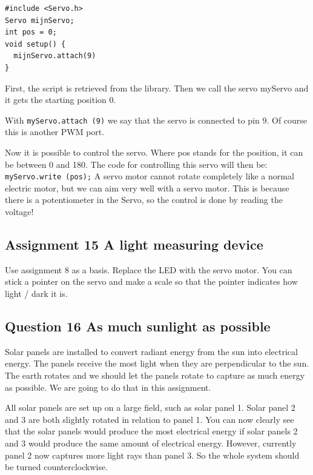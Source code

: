 \documentclass{arduino}
\begin{document}
\begin{lstlisting}
#include <Servo.h>
Servo mijnServo;
int pos = 0;
void setup() {
  mijnServo.attach(9)
}
\end{lstlisting}

First, the script is retrieved from the library. Then we call the servo myServo and it gets the starting position 0.

With \lstinline{myServo.attach (9)} we say that the servo is connected to pin 9. Of course this is another PWM port.

Now it is possible to control the servo. Where pos stands for the position, it can be between 0 and 180. The code for controlling this servo will then be: \lstinline{myServo.write (pos);} A servo motor cannot rotate completely like a normal electric motor, but we can aim very well with a servo motor. This is because there is a potentiometer in the Servo, so the control is done by reading the voltage!

\subsection{Assignment 15 A light measuring device}

Use assignment 8 as a basis. Replace the LED with the servo motor. You can stick a pointer on the servo and make a scale so that the pointer indicates how light / dark it is.

\subsection{Question 16 As much sunlight as possible}


Solar panels are installed to convert radiant energy from the sun into electrical energy. The panels receive the most light when they are perpendicular to the sun. The earth rotates and we should let the panels rotate to capture as much energy as possible. We are going to do that in this assignment.

All solar panels are set up on a large field, such as solar panel 1. Solar panel 2 and 3 are both slightly rotated in relation to panel 1. You can now clearly see that the solar panels would produce the most electrical energy if solar panels 2 and 3 would produce the same amount of electrical energy. However, currently panel 2 now captures more light rays than panel 3. So the whole system should be turned counterclockwise.
\end{document}
